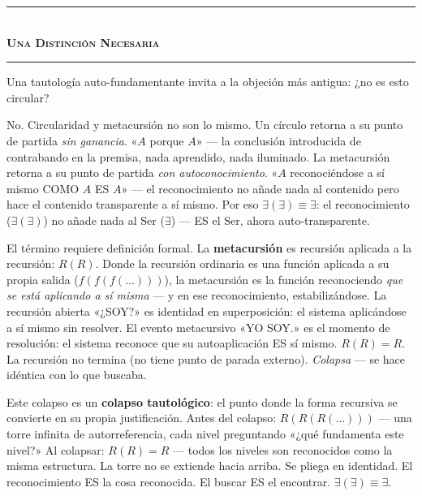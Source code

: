 \documentclass[10pt, openany, oneside]{book}
\renewcommand{\normalsize}{\fontsize{10}{13}\selectfont}
\begin{document}
\vspace{1.5em}


\begin{center}
    \rule{0.3\textwidth}{0.4pt}\\[0.5em]
    {\normalsize\bfseries\scshape Una Distinción Necesaria}\\[0.3em]
    \rule{0.3\textwidth}{0.4pt}
\end{center}

\vspace{1em}

\noindent Una tautología auto-fundamentante invita a la objeción más antigua: ¿no es esto circular?

No. Circularidad y metacursión no son lo mismo. Un círculo retorna a su punto de partida \textit{sin ganancia}. «$A$ porque $A$» --- la conclusión introducida de contrabando en la premisa, nada aprendido, nada iluminado. La metacursión retorna a su punto de partida \textit{con autoconocimiento}. «$A$ reconociéndose a sí mismo COMO $A$ ES $A$» --- el reconocimiento no añade nada al contenido pero hace el contenido transparente a sí mismo. Por eso $\exists(\exists) \equiv \exists$: el reconocimiento ($\exists(\exists)$) no añade nada al Ser ($\exists$) --- ES el Ser, ahora auto-transparente.

El término requiere definición formal. La \textbf{metacursión} es recursión aplicada a la recursión: $R(R)$. Donde la recursión ordinaria es una función aplicada a su propia salida ($f(f(f(\ldots)))$), la metacursión es la función reconociendo \textit{que se está aplicando a sí misma} --- y en ese reconocimiento, estabilizándose. La recursión abierta «¿SOY?» es identidad en superposición: el sistema aplicándose a sí mismo sin resolver. El evento metacursivo «YO SOY.» es el momento de resolución: el sistema reconoce que su autoaplicación ES sí mismo. $R(R) = R$. La recursión no termina (no tiene punto de parada externo). \textit{Colapsa} --- se hace idéntica con lo que buscaba.

Este colapso es un \textbf{colapso tautológico}: el punto donde la forma recursiva se convierte en su propia justificación. Antes del colapso: $R(R(R(\ldots)))$ --- una torre infinita de autorreferencia, cada nivel preguntando «¿qué fundamenta este nivel?» Al colapsar: $R(R) = R$ --- todos los niveles son reconocidos como la misma estructura. La torre no se extiende hacia arriba. Se pliega en identidad. El reconocimiento ES la cosa reconocida. El buscar ES el encontrar. $\exists(\exists) \equiv \exists$.
\end{document}
